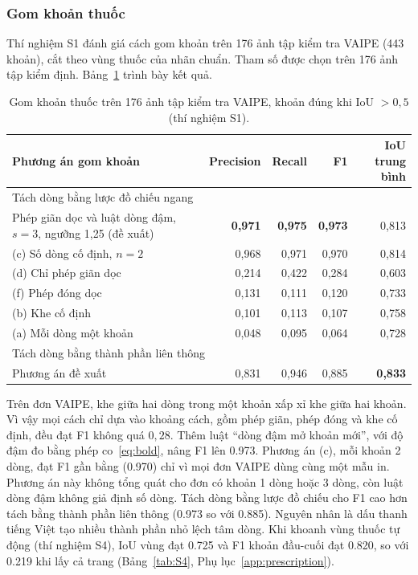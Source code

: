 \subsubsection{Gom khoản thuốc}
Thí nghiệm S1 đánh giá cách gom khoản trên 176 ảnh tập kiểm tra VAIPE (443 khoản), cắt theo vùng thuốc của nhãn chuẩn.
Tham số được chọn trên 176 ảnh tập kiểm định.
Bảng~\ref{tab:S1} trình bày kết quả.

\begin{table}[H]
\centering
\caption{Gom khoản thuốc trên 176 ảnh tập kiểm tra VAIPE, khoản đúng khi IoU $>0{,}5$ (thí nghiệm S1).}\label{tab:S1}
\small
\begin{tabular}{lrrrr}
\toprule
\textbf{Phương án gom khoản} & \textbf{Precision} & \textbf{Recall} & \textbf{F1} & \makecell[r]{\textbf{IoU}\\\textbf{trung bình}} \\
\midrule
\multicolumn{5}{l}{Tách dòng bằng lược đồ chiếu ngang} \\
\makecell[l]{Phép giãn dọc và luật dòng đậm,\\$s=3$, ngưỡng 1,25 (đề xuất)} & \textbf{0,971} & \textbf{0,975} & \textbf{0,973} & 0,813 \\
(c) Số dòng cố định, $n=2$ & 0,968 & 0,971 & 0,970 & 0,814 \\
(d) Chỉ phép giãn dọc & 0,214 & 0,422 & 0,284 & 0,603 \\
(f) Phép đóng dọc & 0,131 & 0,111 & 0,120 & 0,733 \\
(b) Khe cố định & 0,101 & 0,113 & 0,107 & 0,758 \\
(a) Mỗi dòng một khoản & 0,048 & 0,095 & 0,064 & 0,728 \\
\midrule
\multicolumn{5}{l}{Tách dòng bằng thành phần liên thông} \\
Phương án đề xuất & 0,831 & 0,946 & 0,885 & \textbf{0,833} \\
\bottomrule
\end{tabular}
\end{table}

Trên đơn VAIPE, khe giữa hai dòng trong một khoản xấp xỉ khe giữa hai khoản.
Vì vậy mọi cách chỉ dựa vào khoảng cách, gồm phép giãn, phép đóng và khe cố định, đều đạt F1 không quá $0{,}28$.
Thêm luật ``dòng đậm mở khoản mới'', với độ đậm đo bằng phép co~\eqref{eq:bold}, nâng F1 lên \num{0.973}.
Phương án (c), mỗi khoản 2 dòng, đạt F1 gần bằng (\num{0.970}) chỉ vì mọi đơn VAIPE dùng cùng một mẫu in.
Phương án này không tổng quát cho đơn có khoản 1 dòng hoặc 3 dòng, còn luật dòng đậm không giả định số dòng.
Tách dòng bằng lược đồ chiếu cho F1 cao hơn tách bằng thành phần liên thông (\num{0.973} so với \num{0.885}).
Nguyên nhân là dấu thanh tiếng Việt tạo nhiều thành phần nhỏ lệch tâm dòng.
Khi khoanh vùng thuốc tự động (thí nghiệm S4), IoU vùng đạt \num{0.725} và F1 khoản đầu-cuối đạt \num{0.820}, so với \num{0.219} khi lấy cả trang (Bảng~\ref{tab:S4}, Phụ lục~\ref{app:prescription}).

